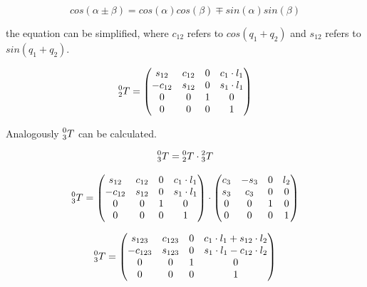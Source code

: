 \begin{equation}
  cos(\alpha \pm \beta)= cos(\alpha) cos(\beta) \mp sin(\alpha)sin(\beta)
\end{equation}

the equation can be simplified, where $c_{12}$ refers to $cos(q_1+q_2)$ and $s_{12}$ refers to $sin(q_1+q_2)$.

\begin{equation}
   \prescript{0}{2}{T} = \begin{pmatrix} 
  s_{12} & c_{12} & 0 & c_1 \cdot l_1\\
   -c_{12} & s_{12} & 0& s_1 \cdot l_1\\
   0& 0 & 1 &  0       \\
   0 & 0 & 0 & 1\end{pmatrix}
\end{equation}

Analogously $ \prescript{0}{3}{T}$ can be calculated. 

\begin{equation}
   \prescript{0}{3}{T} = \prescript{0}{2}{T} \cdot \prescript{2}{3}{T}
\end{equation}

\begin{equation}
   \prescript{0}{3}{T} = \begin{pmatrix} 
  s_{12} & c_{12} & 0 & c_1 \cdot l_1\\
   -c_{12} & s_{12} & 0& s_1 \cdot l_1\\
   0& 0 & 1 &  0       \\
   0 & 0 & 0 & 1\end{pmatrix} \cdot \begin{pmatrix} 
  c_3 & -s_3 & 0 & l_2\\
   s_3 & c_3 & 0& 0\\
   0& 0 & 1 &  0       \\
   0 & 0 & 0 & 1\end{pmatrix} 
   \label{eq:tsum}
\end{equation}

\begin{equation}
   \prescript{0}{3}{T} = \begin{pmatrix} 
  s_{123} & c_{123} & 0 & c_1 \cdot l_1 + s_{12} \cdot l_2\\
   - c_{123} & s_{123} & 0& s_1 \cdot l_1 - c_{12} \cdot l_2\\
   0& 0 & 1 &  0       \\
   0 & 0 & 0 & 1\end{pmatrix}
\end{equation}

